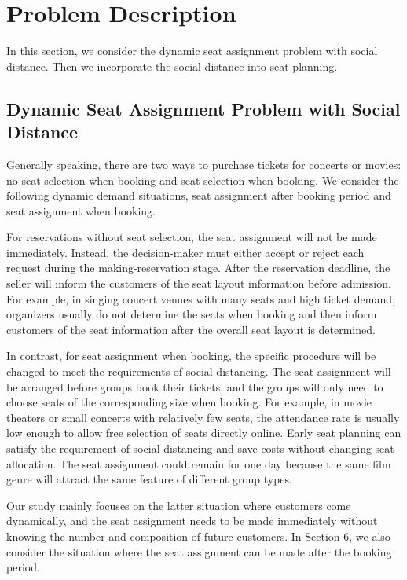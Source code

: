 \section{Problem Description}
In this section, we consider the dynamic seat assignment problem with social distance. Then we incorporate the social distance into seat planning.



\subsection{Dynamic Seat Assignment Problem with Social Distance}\label{dynamic_demand}

Generally speaking, there are two ways to purchase tickets for concerts or movies: no seat selection when booking and seat selection when booking. We consider the following dynamic demand situations, seat assignment after booking period and seat assignment when booking.

For reservations without seat selection, the seat assignment will not be made immediately. Instead, the decision-maker must either accept or reject each request during the making-reservation stage. After the reservation deadline, the seller will inform the customers of the seat layout information before admission. For example, in singing concert venues with many seats and high ticket demand, organizers usually do not determine the seats when booking and then inform customers of the seat information after the overall seat layout is determined.

In contrast, for seat assignment when booking, the specific procedure will be changed to meet the requirements of social distancing. The seat assignment will be arranged before groups book their tickets, and the groups will only need to choose seats of the corresponding size when booking. For example, in movie theaters or small concerts with relatively few seats, the attendance rate is usually low enough to allow free selection of seats directly online. Early seat planning can satisfy the requirement of social distancing and save costs without changing seat allocation. The seat assignment could remain for one day because the same film genre will attract the same feature of different group types.

Our study mainly focuses on the latter situation where customers come dynamically, and the seat assignment needs to be made immediately without knowing the number and composition of future customers. In Section 6, we also consider the situation where the seat assignment can be made after the booking period.



